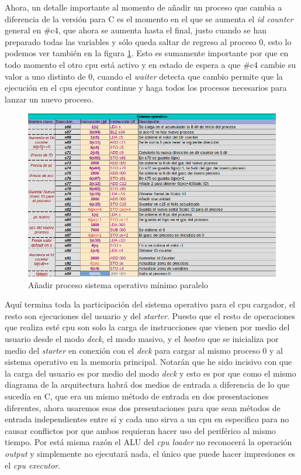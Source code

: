 \documentclass[letterpaper,12pt,oneside]{book}
\begin{document}
			Ahora, un detalle importante al momento de añadir un proceso que cambia a diferencia de la versión para C es el momento en el que se aumenta el 
			\textit{id counter} general en \#c4, que ahora se aumenta hasta el final, justo cuando se han preparado todas las variables y sólo queda
			saltar de regreso al proceso 0, esto lo podemos ver también en la figura \ref{fig:somp_add_process}. Esto es sumamente importante por que en todo momento el 
			otro cpu está activo y en estado de espera
			a que \#c4 cambie su valor a uno distinto de 0, cuando el \textit{waiter} detecta que cambio permite que la ejecución en el
			cpu ejecutor continue y haga todos los procesos necesarios para lanzar un nuevo proceso.
			
			
			\begin{figure}[h]		
				\centering
				\includegraphics[scale=0.57]{media/Paralela/somp_add_process.png}
				\caption{ Añadir proceso sistema operativo mínimo paralelo}
				\label{fig:somp_add_process}
			\end{figure}	
			
			
			Aquí termina toda la participación del sistema operativo para el cpu cargador, el resto son ejecuciones del usuario y del \textit{starter}. Puesto
			que el resto de operaciones que realiza esté cpu son solo la carga de instrucciones que vienen por medio del usuario desde el modo \textit{deck}, el modo 
			masivo, y 
			el \textit{booteo} que se inicializa por medio del \textit{starter} en conexión con el \textit{deck} para cargar al mismo proceso
			0 y al sistema operativo en la memoria principal. Notarán que he sido incisivo con que la carga del usuario es por medio del modo
			\textit{deck} y esto es por que como el mismo diagrama de la arquitectura habrá dos medios de entrada a diferencia de lo que sucedía
			en C, que era un mismo método de entrada  en dos presentaciones diferentes, ahora usaremos esas dos presentaciones para que sean métodos
			de entrada independientes entre sí y cada uno sirva a un cpu en especifico para no causar conflictos por que ambos requieran hacer
			uso del periférico al mismo tiempo. Por está misma razón el ALU del \textit{cpu loader} no reconocerá la operación \textit{output} y simplemente
			no ejecutará nada, el único que puede hacer impresiones es el \textit{cpu executor}.
			
\end{document}
